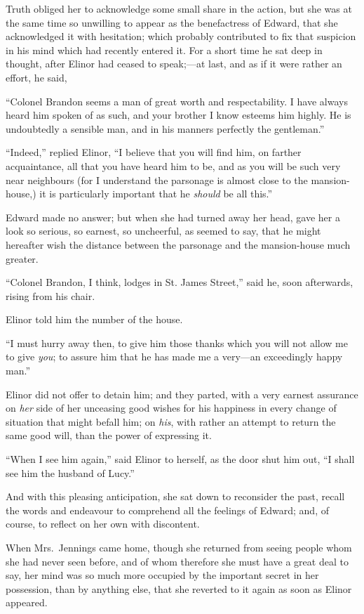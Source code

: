 Truth obliged her to acknowledge some small share
in the action, but she was at the same time so unwilling
to appear as the benefactress of Edward, that she acknowledged
it with hesitation; which probably contributed to fix
that suspicion in his mind which had recently entered it.
For a short time he sat deep in thought, after Elinor had ceased
to speak;---at last, and as if it were rather an effort, he said,

``Colonel Brandon seems a man of great worth and respectability.
I have always heard him spoken of as such, and your brother
I know esteems him highly.  He is undoubtedly a sensible man,
and in his manners perfectly the gentleman.''

``Indeed,'' replied Elinor, ``I believe that you will find him,
on farther acquaintance, all that you have heard him to be,
and as you will be such very near neighbours (for I understand
the parsonage is almost close to the mansion-house,)
it is particularly important that he \emph{should} be all this.''

Edward made no answer; but when she had turned
away her head, gave her a look so serious, so earnest,
so uncheerful, as seemed to say, that he might hereafter wish
the distance between the parsonage and the mansion-house
much greater.

``Colonel Brandon, I think, lodges in St. James Street,''
said he, soon afterwards, rising from his chair.

Elinor told him the number of the house.

``I must hurry away then, to give him those thanks
which you will not allow me to give \emph{you}; to assure him
that he has made me a very---an exceedingly happy man.''

Elinor did not offer to detain him; and they parted,
with a very earnest assurance on \emph{her} side of her unceasing
good wishes for his happiness in every change of situation
that might befall him; on \emph{his}, with rather an attempt to
return the same good will, than the power of expressing it.

``When I see him again,'' said Elinor to herself,
as the door shut him out, ``I shall see him the husband
of Lucy.''

And with this pleasing anticipation, she sat down
to reconsider the past, recall the words and endeavour
to comprehend all the feelings of Edward; and, of course,
to reflect on her own with discontent.

When Mrs.\ Jennings came home, though she returned
from seeing people whom she had never seen before,
and of whom therefore she must have a great deal to say,
her mind was so much more occupied by the important secret
in her possession, than by anything else, that she
reverted to it again as soon as Elinor appeared.

